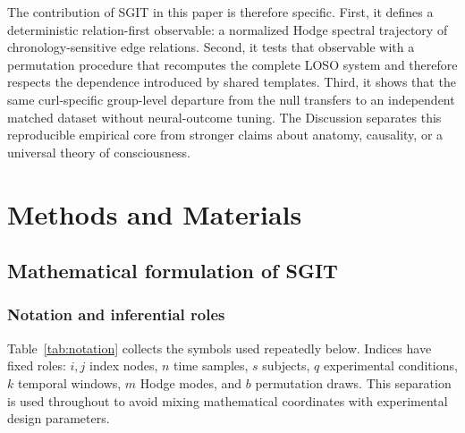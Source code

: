 \documentclass[12pt]{article}
\begin{document}
The contribution of SGIT in this paper is therefore specific. First, it defines a deterministic relation-first observable: a normalized Hodge spectral trajectory of chronology-sensitive edge relations. Second, it tests that observable with a permutation procedure that recomputes the complete LOSO system and therefore respects the dependence introduced by shared templates. Third, it shows that the same curl-specific group-level departure from the null transfers to an independent matched dataset without neural-outcome tuning. The Discussion separates this reproducible empirical core from stronger claims about anatomy, causality, or a universal theory of consciousness.

\section{Methods and Materials}
\subsection{Mathematical formulation of SGIT}
\subsubsection{Notation and inferential roles}
Table~\ref{tab:notation} collects the symbols used repeatedly below. Indices have fixed roles: $i,j$ index nodes, $n$ time samples, $s$ subjects, $q$ experimental conditions, $k$ temporal windows, $m$ Hodge modes, and $b$ permutation draws. This separation is used throughout to avoid mixing mathematical coordinates with experimental design parameters.
\end{document}

